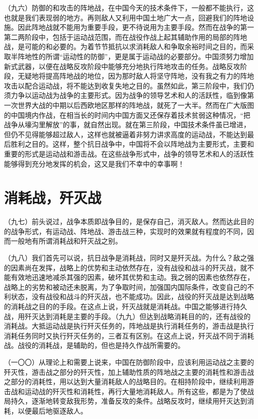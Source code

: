 （九六）防御的和攻击的阵地战，在中国今天的技术条件下，一般都不能执行，这也就是我们表现弱的地方。再则敌人又利用中国土地广大一点，回避我们的阵地设施。因此阵地战就不能用为重要手段，更不待说用为主要手段。然而在战争的第一第二两阶段中，包括于运动战范围，而在战役作战上起其辅助作用的局部的阵地战，是可能的和必要的。为着节节抵抗以求消耗敌人和争取余裕时间之目的，而采取半阵地性的所谓“运动性的防御”，更是属于运动战的必要部分。中国须努力增加新式武器，以便在战略反攻阶段中能够充分地执行阵地攻击的任务。战略反攻阶段，无疑地将提高阵地战的地位，因为那时敌人将坚守阵地，没有我之有力的阵地攻击以配合运动战，将不能达到收复失地之目的。虽然如此，第三阶段中，我们仍须力争以运动战为战争的主要形式。因为战争的领导艺术和人的活跃性，临到像第一次世界大战的中期以后西欧地区那样的阵地战，就死了一大半。然而在广大版图的中国境内作战，在相当长的时间内中国方面又还保存着技术贫弱这种情况，“把战争从壕沟里解放”的事，就自然出现。就在第三阶段，中国技术条件虽已增进，但仍不见得能够超过敌人，这样也就被逼着非努力讲求高度的运动战，不能达到最后胜利之目的。这样，整个抗日战争中，中国将不会以阵地战为主要形式，主要和重要的形式是运动战和游击战。在这些战争形式中，战争的领导艺术和人的活跃性能够得到充分地发挥的机会，这又是我们不幸中的幸事啊！

\section{消耗战，歼灭战}

（九七）前头说过，战争本质即战争目的，是保存自己，消灭敌人。然而达此目的的战争形式，有运动战、阵地战、游击战三种，实现时的效果就有程度的不同，因而一般地有所谓消耗战和歼灭战之别。

（九八）我们首先可以说，抗日战争是消耗战，同时又是歼灭战。为什么？敌之强的因素尚在发挥，战略上的优势和主动依然存在，没有战役和战斗的歼灭战，就不能有效地迅速地减杀其强的因素，破坏其优势和主动。我之弱的因素也依然存在，战略上的劣势和被动还未脱离，为了争取时间，加强国内国际条件，改变自己的不利状态，没有战役和战斗的歼灭战，也不能成功。因此，战役的歼灭战是达到战略的消耗战之目的的手段。在这点上说，歼灭战就是消耗战。中国之能够进行持久战，用歼灭达到消耗是主要的手段。（九九）但达到战略消耗目的的，还有战役的消耗战。大抵运动战是执行歼灭任务的，阵地战是执行消耗任务的，游击战是执行消耗任务同时又执行歼灭任务的，三者互有区别。在这点上说，歼灭战不同于消耗战。战役的消耗战，是辅助的，但也是持久作战所需要的。

（一〇〇）从理论上和需要上说来，中国在防御阶段中，应该利用运动战之主要的歼灭性，游击战之部分的歼灭性，加上辅助性质的阵地战之主要的消耗性和游击战之部分的消耗性，用以达到大量消耗敌人的战略目的。在相持阶段中，继续利用游击战和运动战的歼灭性和消耗性，再行大量地消耗敌人。所有这些，都是为了使战局持久，逐渐地转变敌我形势，准备反攻的条件。战略反攻时，继续用歼灭达到消耗，以便最后地驱逐敌人。

